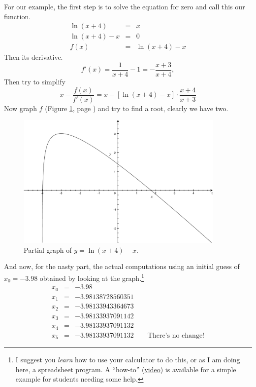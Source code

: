 \documentclass[12pt,addpoints, answers, fleqn]{exam}
\begin{document}
For our example, the first step is to solve the equation for zero and call this our function.
\begin{eqnarray*}
\ln \left( x + 4 \right) &=&  x\\
\ln \left( x + 4 \right) - x &=&  0\\
f\left(x\right) &=& \ln \left( x + 4 \right) - x
\end{eqnarray*}
Then its derivative.
\[
f'\left(x\right) = \frac{1}{x+4} - 1 = -\frac{x+3}{x+4},
\]
Then try to simplify
\[
x - \frac{f\left( x \right)}{f'\left( x \right)} = x + \left[ \ln \left( x + 4 \right) - x \right] \cdot \frac{x+4}{x+3}
\]
Now graph $f$ (Figure \ref{fig:NM2502}, page \pageref{fig:NM2502}) and try to find a root, clearly we have two.
\begin{figure}[htbp] %
   \centering
   \includegraphics[width=4in]{./graphics/graph2502.pdf} 
   \caption{Partial graph of $y = \ln \left( x + 4 \right) - x$.}
   \label{fig:NM2502}
\end{figure}
And now, for the nasty part, the actual computations using an initial guess of $x_0 = -3.98$ obtained by looking at the graph.\footnote{I suggest you \emph{learn} how to use your calculator to do this, or as I am doing here, a spreadsheet program. A ``how-to'' (\href{http://screencast.com/t/c4GhvJqX}{video}) is available for a simple example for students needing some help.}
\begin{eqnarray*}
x_0 &=& -3.98\\
x_1 &=&-3.98138728560351\\
x_2 &=& -3.98133943364673\\
x_3 &=& -3.98133937091142\\
x_4 &=& -3.98133937091132\\
x_5 &=& -3.98133937091132 \qquad \text{There's no change!}
\end{eqnarray*}
\end{document}
